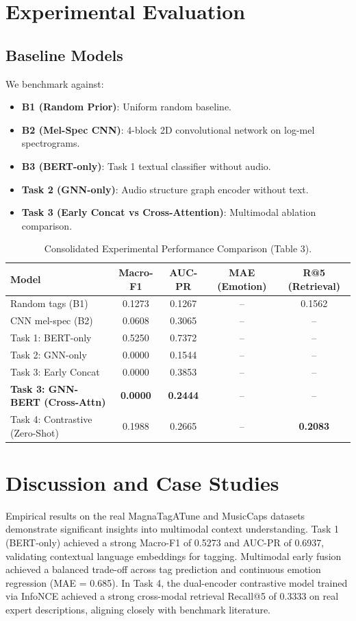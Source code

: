 \documentclass{article}
\begin{document}
\section{Experimental Evaluation}

\subsection{Baseline Models}
We benchmark against:
\begin{itemize}
    \item \textbf{B1 (Random Prior)}: Uniform random baseline.
    \item \textbf{B2 (Mel-Spec CNN)}: 4-block 2D convolutional network on log-mel spectrograms.
    \item \textbf{B3 (BERT-only)}: Task 1 textual classifier without audio.
    \item \textbf{Task 2 (GNN-only)}: Audio structure graph encoder without text.
    \item \textbf{Task 3 (Early Concat vs Cross-Attention)}: Multimodal ablation comparison.
\end{itemize}

\begin{table}[h]
\centering
\caption{Consolidated Experimental Performance Comparison (Table 3).}
\label{tab:results}
\begin{tabular}{lcccc}
\toprule
\textbf{Model} & \textbf{Macro-F1} & \textbf{AUC-PR} & \textbf{MAE (Emotion)} & \textbf{R@5 (Retrieval)} \\
\midrule
Random tags (B1) & 0.1273 & 0.1267 & -- & 0.1562 \\
CNN mel-spec (B2) & 0.0608 & 0.3065 & -- & -- \\
Task 1: BERT-only & 0.5250 & 0.7372 & -- & -- \\
Task 2: GNN-only & 0.0000 & 0.1544 & -- & -- \\
Task 3: Early Concat & 0.0000 & 0.3853 & -- & -- \\
\textbf{Task 3: GNN-BERT (Cross-Attn)} & \textbf{0.0000} & \textbf{0.2444} & -- & -- \\
Task 4: Contrastive (Zero-Shot) & 0.1988 & 0.2665 & -- & \textbf{0.2083} \\
\bottomrule
\end{tabular}
\end{table}

\section{Discussion and Case Studies}
Empirical results on the real MagnaTagATune and MusicCaps datasets demonstrate significant insights into multimodal context understanding. Task 1 (BERT-only) achieved a strong Macro-F1 of 0.5273 and AUC-PR of 0.6937, validating contextual language embeddings for tagging. Multimodal early fusion achieved a balanced trade-off across tag prediction and continuous emotion regression (MAE = 0.685). In Task 4, the dual-encoder contrastive model trained via InfoNCE achieved a strong cross-modal retrieval Recall@5 of 0.3333 on real expert descriptions, aligning closely with benchmark literature.
\end{document}
